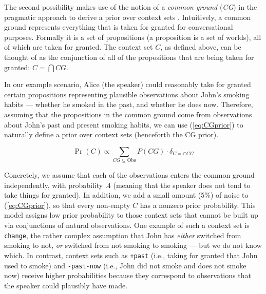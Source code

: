 
The second possibility makes use of the notion of a \emph{common ground} (\emph{CG}) 
 in the pragmatic approach to derive a prior over context sets
 \cite{Stalnaker1974:Pragmatic-Presuppositions}.
Intuitively, a common ground represents everything that is taken for granted for conversational purposes.
Formally it is a set of propositions (a proposition is a set of
  worlds), all of which are taken for granted. The context set $C$, as defined above, can be thought of as the conjunction of all of the propositions that are being taken for granted: $C = \bigcap \mathit{CG}$.
  
In our example scenario, Alice (the speaker) could reasonably take for granted certain propositions representing plausible observations about John's smoking habits --- whether he smoked in the past, and whether he does now.
Therefore, assuming that the propositions in the common ground come from 
 observations about John's past and present smoking habits, 
 we can use (\ref{eq:CGprior}) to naturally define a prior over context sets (henceforth the CG prior).

\begin{equation}
\Pr(C) \propto \sum_{CG\subseteq\text{Obs}} P(CG) \cdot \delta_{C=\cap CG}
\label{eq:CGprior}
\end{equation}
  
Concretely, we assume that each of the observations enters the common ground
 independently, with probability $.4$ (meaning that the speaker does not tend to 
 take things for granted).
In addition, we add a small amount (5\%) of noise to (\ref{eq:CGprior}), so that every non-empty $C$ has a nonzero prior probability. This model assigns low prior probability to those context sets that cannot be built up via conjunctions of natural observations. One example of such a context set is \verb=change=, the rather complex assumption that John has \emph{either} switched from smoking to not, \emph{or} switched from not smoking to smoking --- but we do not know which. In contrast, context sets such as \verb|+past| (i.e., taking for granted that John used to smoke) and \verb|-past-now| (i.e., John did not smoke and does not smoke now) receive higher probabilities because they correspond to observations that the speaker could plausibly have made.  

